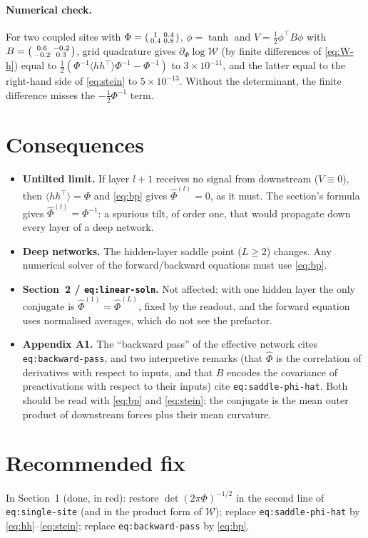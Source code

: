 \documentclass[11pt,a4paper]{article}
\newcommand{\W}{\mathcal W}
\begin{document}
\paragraph{Numerical check.} For two coupled sites with
$\Phi = \begin{psmallmatrix}1&0.4\\0.4&0.8\end{psmallmatrix}$, $\phi=\tanh$ and
$V = \frac12\phi^\top B\phi$ with
$B = \begin{psmallmatrix}0.6&-0.2\\-0.2&0.3\end{psmallmatrix}$, grid quadrature gives
$\partial_\Phi\log\W$ (by finite differences of \eqref{eq:W-h}) equal to
$\frac12(\Phi^{-1}\langle hh^\top\rangle\Phi^{-1}-\Phi^{-1})$ to $3\times10^{-11}$,
and the latter equal to the right-hand side of \eqref{eq:stein} to $5\times10^{-13}$.
Without the determinant, the finite difference misses the $-\frac12\Phi^{-1}$ term.

\section{Consequences}

\begin{itemize}
  \item \textbf{Untilted limit.} If layer $l+1$ receives no signal from downstream
    ($V\equiv0$), then $\langle hh^\top\rangle = \Phi$ and \eqref{eq:bp} gives
    $\hat\Phi^{(l)} = 0$, as it must. The section's formula gives
    $\hat\Phi^{(l)} = \Phi^{-1}$: a spurious tilt, of order one, that would
    propagate down every layer of a deep network.
  \item \textbf{Deep networks.} The hidden-layer saddle point
    ($L\ge2$) changes. Any numerical solver of the forward/backward
    equations must use \eqref{eq:bp}.
  \item \textbf{Section~2 / \texttt{eq:linear-soln}.} Not affected: with one
    hidden layer the only conjugate is $\hat\Phi^{(1)}=\hat\Phi^{(L)}$, fixed by the
    readout, and the forward equation uses normalised averages, which do not see
    the prefactor.
  \item \textbf{Appendix A1.} The ``backward pass'' of the effective network
    cites \texttt{eq:backward-pass}, and two interpretive remarks (that $\hat\Phi$
    is the correlation of derivatives with respect to inputs, and that $B$
    encodes the covariance of preactivations with respect to their inputs) cite
    \texttt{eq:saddle-phi-hat}. Both should be read with \eqref{eq:bp} and
    \eqref{eq:stein}: the conjugate is the mean outer product of downstream
    forces plus their mean curvature.
\end{itemize}

\section{Recommended fix}

In Section~1 (done, in red): restore $\det(2\pi\Phi)^{-1/2}$ in the second line of
\texttt{eq:single-site} (and in the product form of $\W$); replace
\texttt{eq:saddle-phi-hat} by \eqref{eq:hh}--\eqref{eq:stein}; replace
\texttt{eq:backward-pass} by \eqref{eq:bp}.
\end{document}

